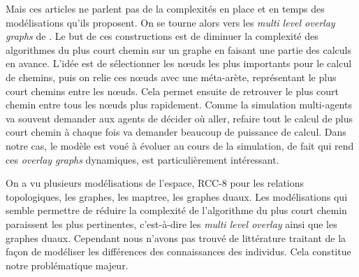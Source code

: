 \documentclass[a4paper]{article}
\begin{document}
Mais ces articles ne parlent pas de la complexités en place et en temps des
modélisations qu'ils proposent. On se tourne alors vers les \emph{multi level
overlay graphs} de \cite{holzer2009}. Le but de ces constructions est de
diminuer la complexité des algorithmes du plus court chemin sur un graphe en
faisant une partie des calculs en avance. L'idée est de sélectionner les nœuds
les plus importants pour le calcul de chemins, puis on relie ces nœuds avec une
méta-arète, représentant le plus court chemins entre les nœuds. Cela permet
ensuite de retrouver le plus court chemin entre tous les nœuds plus rapidement.
Comme la simulation multi-agents va souvent demander aux agents de décider où
aller, refaire tout le calcul de plus court chemin à chaque fois va demander
beaucoup de puissance de calcul. Dans notre cas, le modèle est voué à évoluer
au cours de la simulation, de fait \cite{bruera2008} qui rend ces \emph{overlay
graphs} dynamiques, est particulièrement intéressant.

On a vu plusieurs modélisations de l'espace, RCC-8 pour les relations
topologiques, les graphes, les maptree, les graphes duaux. Les modélisations qui
semble permettre de réduire la complexité de l'algorithme du plus court chemin
paraissent les plus pertinentes, c'est-à-dire les \emph{multi level overlay}
ainsi que les graphes duaux. Cependant nous n'avons pas trouvé de littérature
traitant de la façon de modéliser les différences des connaissances des
individus. Cela constitue notre problématique majeur.

 
\end{document}
